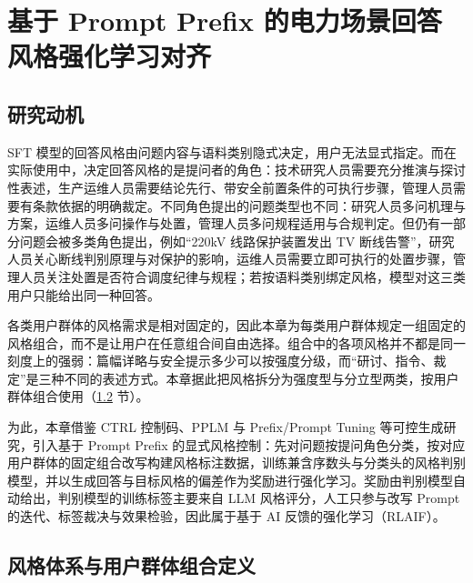 \documentclass[fontset=fandol,type=master,campus=shenzhen,etitleauto=true]{hithesisbook}
\begin{document}
\chapter{基于 Prompt Prefix 的电力场景回答风格强化学习对齐}\label{ux57faux4e8e-prompt-prefix-ux7684ux7535ux529bux573aux666fux56deux7b54ux98ceux683cux5f3aux5316ux5b66ux4e60ux5bf9ux9f50}

\section{研究动机}\label{ux7814ux7a76ux52a8ux673a-1}

SFT 模型的回答风格由问题内容与语料类别隐式决定，用户无法显式指定。而在实际使用中，决定回答风格的是提问者的角色：技术研究人员需要充分推演与探讨性表述，生产运维人员需要结论先行、带安全前置条件的可执行步骤，管理人员需要有条款依据的明确裁定。不同角色提出的问题类型也不同：研究人员多问机理与方案，运维人员多问操作与处置，管理人员多问规程适用与合规判定。但仍有一部分问题会被多类角色提出，例如“220kV 线路保护装置发出 TV 断线告警”，研究人员关心断线判别原理与对保护的影响，运维人员需要立即可执行的处置步骤，管理人员关注处置是否符合调度纪律与规程；若按语料类别绑定风格，模型对这三类用户只能给出同一种回答。

各类用户群体的风格需求是相对固定的，因此本章为每类用户群体规定一组固定的风格组合，而不是让用户在任意组合间自由选择。组合中的各项风格并不都是同一刻度上的强弱：篇幅详略与安全提示多少可以按强度分级，而“研讨、指令、裁定”是三种不同的表述方式。本章据此把风格拆分为强度型与分立型两类，按用户群体组合使用（\ref{ux4e09ux7c7bux98ceux683c-prefix-ux5b9aux4e49} 节）。

为此，本章借鉴 CTRL 控制码、PPLM 与 Prefix/Prompt Tuning 等可控生成研究\cite{ref36,ref37,ref38,ref39}，引入基于 Prompt Prefix 的显式风格控制：先对问题按提问角色分类，按对应用户群体的固定组合改写构建风格标注数据，训练兼含序数头与分类头的风格判别模型，并以生成回答与目标风格的偏差作为奖励进行强化学习。奖励由判别模型自动给出，判别模型的训练标签主要来自 LLM 风格评分，人工只参与改写 Prompt 的迭代、标签裁决与效果检验，因此属于基于 AI 反馈的强化学习（RLAIF）\cite{ref44,ref90}。

\section{风格体系与用户群体组合定义}\label{ux4e09ux7c7bux98ceux683c-prefix-ux5b9aux4e49}
\end{document}
